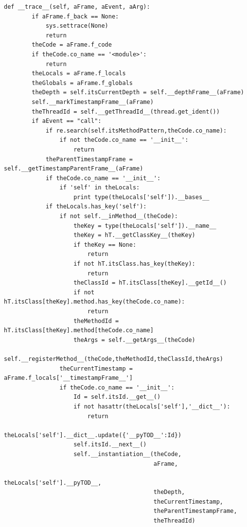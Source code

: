 \documentclass[12pt,legalpaper]{report}
\begin{document}
\begin{singlespace}
\begin{lstlisting}[style=Python]
    def __trace__(self, aFrame, aEvent, aArg):
        if aFrame.f_back == None:
            sys.settrace(None)
            return
        theCode = aFrame.f_code
        if theCode.co_name == '<module>':
            return
        theLocals = aFrame.f_locals
        theGlobals = aFrame.f_globals
        theDepth = self.itsCurrentDepth = self.__depthFrame__(aFrame)
        self.__markTimestampFrame__(aFrame)
        theThreadId = self.__getThreadId__(thread.get_ident())
        if aEvent == "call":
            if re.search(self.itsMethodPattern,theCode.co_name):
                if not theCode.co_name == '__init__':
                    return
            theParentTimestampFrame = self.__getTimestampParentFrame__(aFrame)
            if theCode.co_name == '__init__':
                if 'self' in theLocals:
                    print type(theLocals['self']).__bases__
            if theLocals.has_key('self'):
                if not self.__inMethod__(theCode):
                    theKey = type(theLocals['self']).__name__
                    theKey = hT.__getClassKey__(theKey)
                    if theKey == None:
                        return
                    if not hT.itsClass.has_key(theKey):
                        return
                    theClassId = hT.itsClass[theKey].__getId__()
                    if not hT.itsClass[theKey].method.has_key(theCode.co_name):
                        return
                    theMethodId = hT.itsClass[theKey].method[theCode.co_name]
                    theArgs = self.__getArgs__(theCode)
                    self.__registerMethod__(theCode,theMethodId,theClassId,theArgs)
                theCurrentTimestamp = aFrame.f_locals['__timestampFrame__']
                if theCode.co_name == '__init__':
                    Id = self.itsId.__get__()
                    if not hasattr(theLocals['self'],'__dict__'):
                        return
                    theLocals['self'].__dict__.update({'__pyTOD__':Id})
                    self.itsId.__next__()
                    self.__instantiation__(theCode,
                                           aFrame,
                                           theLocals['self'].__pyTOD__,
                                           theDepth,
                                           theCurrentTimestamp,
                                           theParentTimestampFrame,
                                           theThreadId)


\end{lstlisting}
\end{singlespace}
\end{document}
